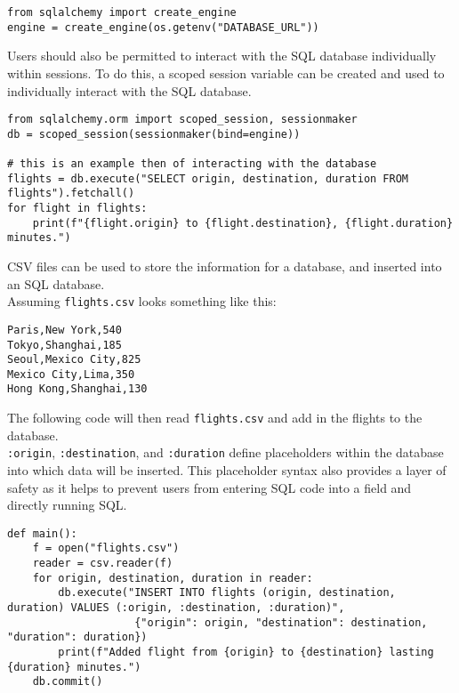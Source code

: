 \documentclass[]{book}
\begin{document}
\begin{verbatim}
from sqlalchemy import create_engine
engine = create_engine(os.getenv("DATABASE_URL"))
\end{verbatim}

Users should also be permitted to interact with the SQL database
individually within sessions. To do this, a scoped session variable can
be created and used to individually interact with the SQL database.

\begin{verbatim}
from sqlalchemy.orm import scoped_session, sessionmaker
db = scoped_session(sessionmaker(bind=engine))

# this is an example then of interacting with the database
flights = db.execute("SELECT origin, destination, duration FROM flights").fetchall()
for flight in flights:
    print(f"{flight.origin} to {flight.destination}, {flight.duration} minutes.")
\end{verbatim}

CSV files can be used to store the information for a database, and
inserted into an SQL database.\\
Assuming \texttt{flights.csv} looks something like this:

\begin{verbatim}
Paris,New York,540    
Tokyo,Shanghai,185    
Seoul,Mexico City,825 
Mexico City,Lima,350  
Hong Kong,Shanghai,130
\end{verbatim}

The following code will then read \texttt{flights.csv} and add in the
flights to the database.\\
\texttt{:origin}, \texttt{:destination}, and \texttt{:duration} define
placeholders within the database into which data will be inserted. This
placeholder syntax also provides a layer of safety as it helps to
prevent users from entering SQL code into a field and directly running
SQL.

\begin{verbatim}
def main():
    f = open("flights.csv")                                                                                        
    reader = csv.reader(f)                                                                                         
    for origin, destination, duration in reader:                                                                   
        db.execute("INSERT INTO flights (origin, destination, duration) VALUES (:origin, :destination, :duration)",
                    {"origin": origin, "destination": destination, "duration": duration})                          
        print(f"Added flight from {origin} to {destination} lasting {duration} minutes.")                          
    db.commit()                                                                                                    
\end{verbatim}
\end{document}
